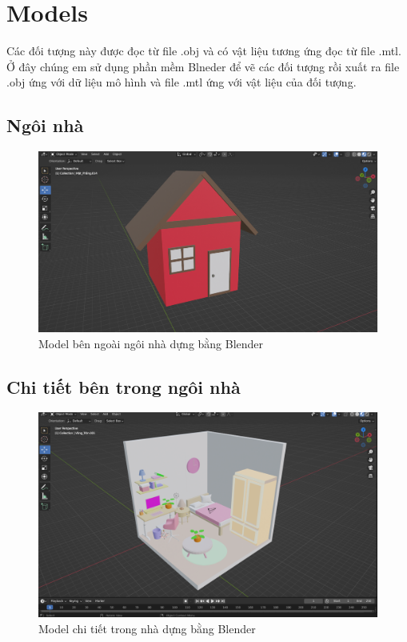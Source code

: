 \section{Models}
Các đối tượng này được đọc từ file .obj và có vật liệu tương ứng đọc từ file .mtl. Ở đây chúng em sử dụng phần mềm Blneder để vẽ các đối tượng rồi xuất ra file .obj ứng với dữ liệu mô hình và file .mtl ứng với vật liệu của đối tượng.

\subsection{Ngôi nhà}
\begin{center}
    \begin{figure}[!h]
        \centering
        \includegraphics[scale = 0.4]{contents/house.png}
        \caption{Model bên ngoài ngôi nhà dựng bằng Blender}
    \end{figure}
\end{center}
\subsection{Chi tiết bên trong ngôi nhà}
\begin{center}
    \begin{figure}[!h]
        \centering
        \includegraphics[scale = 0.35]{contents/fullhouse.png}
        \caption{Model chi tiết trong nhà dựng bằng Blender}
    \end{figure}
\end{center}

